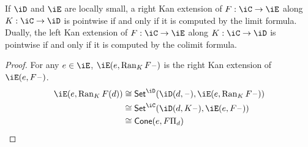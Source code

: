 \documentclass{amsart}
\begin{document}
\begin{thm}
  If $\iD$ and $\iE$ are locally small, a right Kan extension of $F : \iC \to \iE$ along $K : \iC \to \iD$ is pointwise if and only if it is computed by the limit formula.
  Dually, the left Kan extension of $F : \iC \to \iE$ along $K : \iC \to \iD$ is pointwise if and only if it is computed by the colimit formula.
\end{thm}
\begin{proof}
  For any $e \in \iE$, $\iE(e,\ran_{K}F\blank)$ is the right Kan extension of $\iE(e,F\blank)$.
  \begin{align}
    \iE(e, \ran_{K}F(d)) &\iso \mathsf{Set}^{\iD}(\iD(d, \blank), \iE(e, \ran_{K}F\blank))\\
                         &\iso \mathsf{Set}^{\iC}(\iD(d, K\blank), \iE(e, F\blank))\\
                         &\iso \mathsf{Cone}(e,F\Pi_{d})
  \end{align}
\end{proof}



\end{document}
